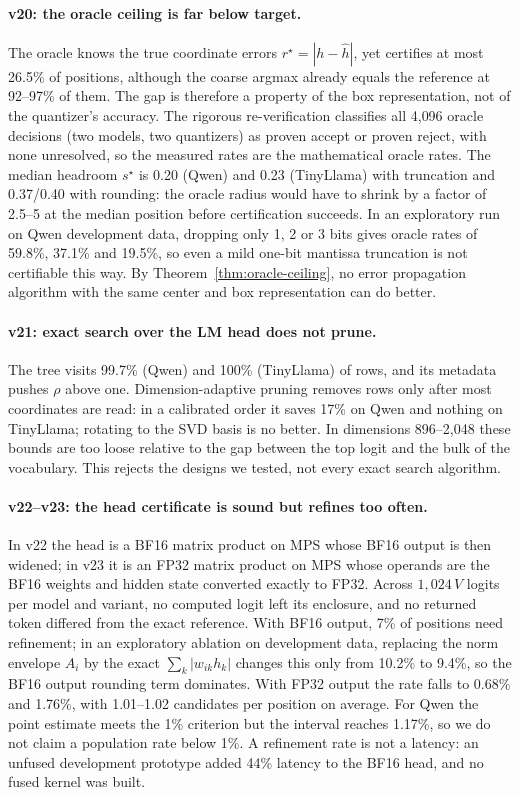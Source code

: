 \documentclass[11pt]{article}
\theoremstyle{definition}
\begin{document}
\paragraph{v20: the oracle ceiling is far below target.} The oracle knows the true
coordinate errors $r^\star=|h-\hat h|$, yet certifies at most 26.5\% of positions,
although the coarse argmax already equals the reference at 92--97\% of them. The
gap is therefore a property of the box representation, not of the quantizer's
accuracy. The rigorous re-verification classifies all 4{,}096 oracle decisions
(two models, two quantizers) as proven accept or proven reject, with none
unresolved, so the measured rates are the mathematical oracle rates. The median
headroom $s^\star$ is 0.20 (Qwen) and 0.23 (TinyLlama) with truncation and
0.37/0.40 with rounding: the oracle radius would have to shrink by a factor of
2.5--5 at the median position before certification succeeds. In an exploratory
run on Qwen development data, dropping only 1, 2 or 3 bits gives oracle rates of
59.8\%, 37.1\% and 19.5\%, so even a mild one-bit mantissa truncation is not
certifiable this way. By Theorem~\ref{thm:oracle-ceiling}, no error propagation
algorithm with the same center and box representation can do better.

\paragraph{v21: exact search over the LM head does not prune.} The tree visits
99.7\% (Qwen) and 100\% (TinyLlama) of rows, and its metadata pushes $\rho$ above
one. Dimension-adaptive pruning removes rows only after most coordinates are read:
in a calibrated order it saves 17\% on Qwen and nothing on TinyLlama; rotating to
the SVD basis is no better. In dimensions 896--2{,}048 these bounds are too loose
relative to the gap between the top logit and the bulk of the vocabulary. This
rejects the designs we tested, not every exact search algorithm.

\paragraph{v22--v23: the head certificate is sound but refines too often.} In v22
the head is a BF16 matrix product on MPS whose BF16 output is then widened; in v23
it is an FP32 matrix product on MPS whose operands are the BF16 weights and hidden
state converted exactly to FP32. Across $1{,}024\,V$ logits per model and variant, no
computed logit left its enclosure, and no returned token differed from the exact
reference. With BF16 output, 7\% of positions need refinement; in an exploratory
ablation on development data, replacing the norm envelope $A_i$ by the exact
$\sum_k|w_{ik}h_k|$ changes this only from 10.2\% to 9.4\%, so the BF16 output
rounding term dominates. With FP32 output the rate falls to 0.68\% and 1.76\%, with
1.01--1.02 candidates per position on average. For Qwen the point estimate meets
the 1\% criterion but the interval reaches 1.17\%, so we do not claim a population
rate below 1\%. A refinement rate is not a latency: an unfused development
prototype added 44\% latency to the BF16 head, and no fused kernel was built.
\end{document}
